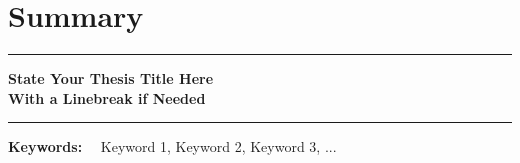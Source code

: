 \chapter*{Summary} %


\begin{center}
\rule{\textwidth}{.75pt}\vspace*{1mm}
\textbf{{\Large State Your Thesis Title Here\\[2mm] With a Linebreak if Needed}}
\rule{\textwidth}{.75pt}
\end{center}
\vspace*{2ex}


\lipsum[1-4]

\vspace*{11pt}\noindent
\textbf{Keywords:} \ \ Keyword 1, Keyword 2, Keyword 3, ...

